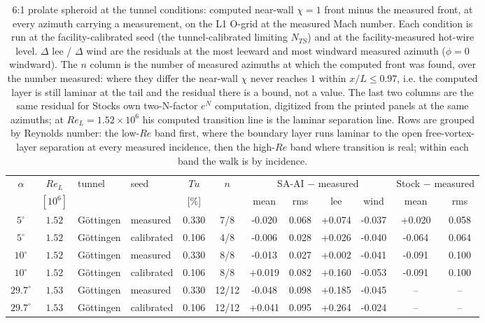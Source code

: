 \begin{table}[tp]
  \centering\small
  \caption{6:1 prolate spheroid at the tunnel conditions: computed near-wall $\chi\!=\!1$ front minus the measured front, at every azimuth carrying a measurement, on the L1 O-grid at the measured Mach number. Each condition is run at the facility-calibrated seed (the tunnel-calibrated limiting $N_{TS}$) and at the facility-measured hot-wire level. $\Delta$ lee / $\Delta$ wind are the residuals at the most leeward and most windward measured azimuth ($\phi\!=\!0$ windward). The $n$ column is the number of measured azimuths at which the computed front was found, over the number measured: where they differ the near-wall $\chi$ never reaches $1$ within $x/L\!\le\!0.97$, i.e. the computed layer is still laminar at the tail and the residual there is a bound, not a value. The last two columns are the same residual for Stocks own two-N-factor $e^N$ computation, digitized from the printed panels at the same azimuths; at $Re_L\!=\!1.52\!\times\!10^6$ his computed transition line is the laminar separation line. Rows are grouped by Reynolds number: the low-$Re$ band first, where the boundary layer runs laminar to the open free-vortex-layer separation at every measured incidence, then the high-$Re$ band where transition is real; within each band the walk is by incidence.}
  \label{tab:sphtunnel}
  \begin{tabular}{cc l l c c cccc cc}
    \toprule
    $\alpha$ & $Re_L$ & tunnel & seed & $Tu$ & $n$ & \multicolumn{4}{c}{SA-AI $-$ measured} & \multicolumn{2}{c}{Stock $-$ measured} \\
    & $[10^6]$ & & & [\%] & & mean & rms & lee & wind & mean & rms \\
    \midrule
    $5^\circ$ & $1.52$ & G\"ottingen & measured & 0.330 & 7/8 & -0.020 & 0.068 & +0.074 & -0.037 & +0.020 & 0.058 \\
    $5^\circ$ & $1.52$ & G\"ottingen & calibrated & 0.106 & 4/8 & -0.006 & 0.028 & +0.026 & -0.040 & -0.064 & 0.064 \\
    $10^\circ$ & $1.52$ & G\"ottingen & measured & 0.330 & 8/8 & -0.013 & 0.027 & +0.002 & -0.041 & -0.091 & 0.100 \\
    $10^\circ$ & $1.52$ & G\"ottingen & calibrated & 0.106 & 8/8 & +0.019 & 0.082 & +0.160 & -0.053 & -0.091 & 0.100 \\
    $29.7^\circ$ & $1.53$ & G\"ottingen & measured & 0.330 & 12/12 & -0.048 & 0.098 & +0.185 & -0.045 & -- & -- \\
    $29.7^\circ$ & $1.53$ & G\"ottingen & calibrated & 0.106 & 12/12 & +0.041 & 0.095 & +0.264 & -0.024 & -- & -- \\

\end{tabular}
\end{table}
